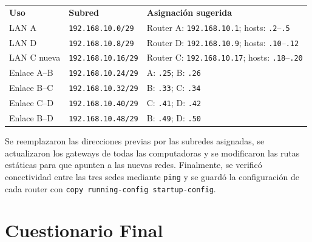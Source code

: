 \documentclass[a4paper,12pt]{article}
\newcommand{\ip}[1]{\texttt{#1}}
\begin{document}
\begin{center}
\begin{tabular}{lll}
\textbf{Uso} & \textbf{Subred} & \textbf{Asignación sugerida} \\
LAN A & \ip{192.168.10.0/29} & Router A: \ip{192.168.10.1}; hosts: \ip{.2}--\ip{.5} \\
LAN D & \ip{192.168.10.8/29} & Router D: \ip{192.168.10.9}; hosts: \ip{.10}--\ip{.12} \\
LAN C nueva & \ip{192.168.10.16/29} & Router C: \ip{192.168.10.17}; hosts: \ip{.18}--\ip{.20} \\
Enlace A--B & \ip{192.168.10.24/29} & A: \ip{.25}; B: \ip{.26} \\
Enlace B--C & \ip{192.168.10.32/29} & B: \ip{.33}; C: \ip{.34} \\
Enlace C--D & \ip{192.168.10.40/29} & C: \ip{.41}; D: \ip{.42} \\
Enlace B--D & \ip{192.168.10.48/29} & B: \ip{.49}; D: \ip{.50} \\
\end{tabular}
\end{center}

Se reemplazaron las direcciones previas por las subredes asignadas, se actualizaron los gateways de todas las computadoras y se modificaron las rutas estáticas para que apunten a las nuevas redes. Finalmente, se verificó conectividad entre las tres sedes mediante \texttt{ping} y se guardó la configuración de cada router con \texttt{copy running-config startup-config}.


\section{Cuestionario Final}
\end{document}
